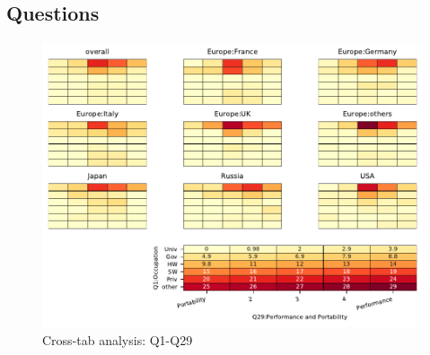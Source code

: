 
\subsection{Questions}


\begin{figure}
\begin{center}
\includegraphics[width=12cm]{../pdfs/Q1-Q29.pdf}
\caption{Cross-tab analysis: Q1-Q29}
\label{fig:Q1-Q29}
\end{center}
\end{figure}

